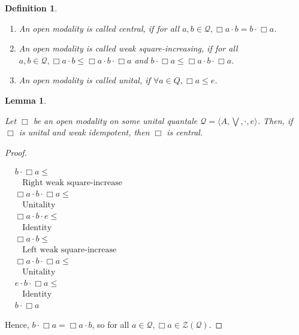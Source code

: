 \documentclass[a4paper]{article}
\theoremstyle{defin}
\newtheorem{defin}{Definition}
\theoremstyle{theorem}
\theoremstyle{prop}
\theoremstyle{lemma}
\newtheorem{lemma}{Lemma}
\theoremstyle{ex}
\theoremstyle{col}
\begin{document}
\begin{defin}
$ $
\begin{enumerate}
  \item An open modality is called central, if for all
  $a, b \in \mathcal{Q}, \Box a \cdot b = b \cdot \Box a$.

  \item An open modality is called weak square-increasing,
  if for all $a, b \in \mathcal{Q}, \Box a \cdot b \leq \Box a \cdot b \cdot \Box a$ and
  $b \cdot \Box a \leq \Box a \cdot b \cdot \Box a$.

  \item An open modality is called unital, if $\forall a \in Q, \Box a \leq e$.
\end{enumerate}
\end{defin}

\begin{lemma}
$ $

  Let $\Box$ be an open modality on some unital quantale $\mathcal{Q} = \langle A, \bigvee, \cdot, e \rangle$.
  Then, if $\Box$ is unital and weak idempotent, then $\Box$ is central.
\end{lemma}

\begin{proof}
$ $

  $\begin{array}{lll}
  & b \cdot \Box a \leq & \\
  & \:\:\:\: \text{Right weak square-increase}& \\
  &\Box a \cdot b \cdot \Box a \leq & \\
  & \:\:\:\: \text{Unitality}& \\
  & \Box a \cdot b \cdot e \leq & \\
  & \:\:\:\: \text{Identity}& \\
  &\Box a \cdot b \leq & \\
  & \:\:\:\: \text{Left weak square-increase}& \\
  &\Box a \cdot b \cdot \Box a \leq & \\
  & \:\:\:\: \text{Unitality}& \\
  &e \cdot b \cdot \Box a \leq & \\
  & \:\:\:\: \text{Identity}& \\
  &b \cdot \Box a&
  \end{array}$

Hence, $b \cdot \Box a = \Box a \cdot b$, so for all $a \in \mathcal Q, \Box a \in \mathcal{Z}(\mathcal{Q})$.

\end{proof}
\end{document}

